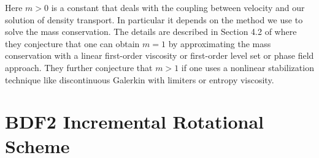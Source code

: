 \documentclass[letterpaper]{erdc}
\begin{document}
\begin{remark}
  Here $m>0$ is a constant that deals with the coupling between velocity and our solution of density transport.  In particular it depends on the method we use to solve the mass conservation.  The details are described in Section 4.2 of \cite{guermond2011error} where they conjecture that one can obtain $m=1$ by approximating the mass conservation with a linear first-order viscosity or first-order level set or phase field approach.  They further conjecture that $m>1$ if one uses a nonlinear stabilization technique like discontinuous Galerkin with limiters or entropy viscosity.  
\end{remark}




\section{BDF2 Incremental Rotational Scheme}






\appendix
%
%
\end{document}

